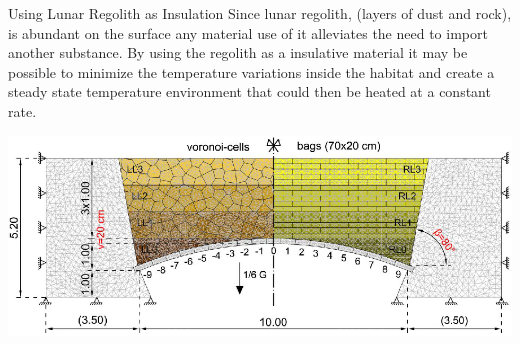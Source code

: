 \documentclass{beamer}
\begin{document}
\begin{frame}{Using Lunar Regolith as Insulation}
Since lunar regolith, (layers of dust and rock), is abundant on the surface any material use of it  alleviates the need to import another substance. By using the regolith as a insulative material it may be possible to minimize the temperature variations inside the habitat and create a steady state temperature environment that could then be heated at a constant rate.
 \begin{center}
             \includegraphics[width=.75\textwidth]{bags.eps}   
      \end{center}  

\end{frame}
\end{document}
